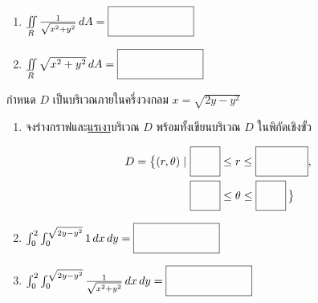 \documentclass[12pt,final]{novelette} %
\begin{document}
\begin{question}
\begin{question}
\begin{enumerate}[label=(\alph*),itemsep=12pt,topsep=5pt]
            \item $\iint\limits_R \frac 1 {\sqrt{x^2 + y^2}} \, d A = \ansbox$

            \item $\iint\limits_R \sqrt{x^2 + y^2} \, d A = \ansbox$
        \end{enumerate}

        \vspace{2em}

        \item กำหนด $D$ เป็นบริเวณภายในครึ่งวงกลม $x = \displaystyle\sqrt{2y - y^2}$
        \begin{enumerate}[label=(\alph*),itemsep=12pt,topsep=5pt]
            \everymath={\displaystyle}
            \item จงร่างกราฟและ\uline{แรเงา}บริเวณ $D$ พร้อมทั้งเขียนบริเวณ $D$ ในพิกัดเชิงขั้ว

                  \medskip
                  \begin{minipage}{0.16\textwidth}
                  \end{minipage}
                  \begin{minipage}{0.46\textwidth}
                      \vspace*{-1.6em}
                      \begin{align*}
                          D = \bigl\{ (r, \theta) \mid \  & \ansboxi{0.7cm} \leq r \leq \ansboxi{1.4cm},              \\
                                                          & \ansboxi{0.7cm} \leq \theta \leq \ansboxi{0.7cm}\,\bigr\}
                      \end{align*}
                  \end{minipage}

            \item $\int_0^2 \int_0^{\sqrt{2y - y^2}} 1 \, d x \, d y = \ansbox$

            \item $\int_0^2 \int_0^{\sqrt{2y - y^2}} \frac 1 {\sqrt{x^2 + y^2}} \, d x \, d y = \ansbox$


\end{enumerate}
\end{question}
\end{question}
\end{document}
